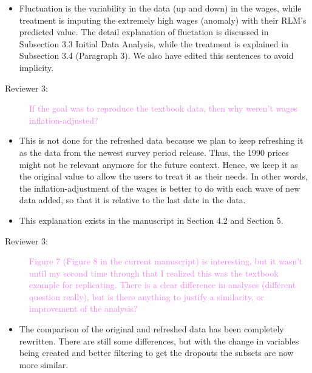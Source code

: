 \documentclass[12pt,a4paper,]{article}
\providecommand{\tightlist}{%
  \setlength{\itemsep}{0pt}\setlength{\parskip}{0pt}}
\begin{document}
\begin{itemize}
\tightlist
\item
  Fluctuation is the variability in the data (up and down) in the wages, while treatment is imputing the extremely high wages (anomaly) with their RLM's predicted value. The detail explanation of fluctation is discussed in Subsection 3.3 Initial Data Analysis, while the treatment is explained in Subsection 3.4 (Paragraph 3). We also have edited this sentences to avoid implicity.
\end{itemize}

\begin{description}
\item[Reviewer 3:]\textcolor{violet}{If the goal was to reproduce the textbook data, then why weren’t wages inflation-adjusted?}
\end{description}

\begin{itemize}
\item
  This is not done for the refreshed data because we plan to keep refreshing it as the data from the newest survey period release. Thus, the 1990 prices might not be relevant anymore for the future context. Hence, we keep it as the original value to allow the users to treat it as their needs. In other words, the inflation-adjustment of the wages is better to do with each wave of new data added, so that it is relative to the last date in the data.
\item
  This explanation exists in the manuscript in Section 4.2 and Section 5.
\end{itemize}

\begin{description}
\item[Reviewer 3:]\textcolor{violet}{Figure 7 (Figure 8 in the current manuscript) is interesting, but it wasn’t until my second time through that I realized this was the textbook example for replicating. There is a clear difference in analyses (different question really), but is there anything to justify a similarity, or improvement of the analysis?}
\end{description}

\begin{itemize}
\tightlist
\item
  The comparison of the original and refreshed data has been completely rewritten. There are still some differences, but with the change in variables being created and better filtering to get the dropouts the subsets are now more similar.
\end{itemize}
\end{document}
